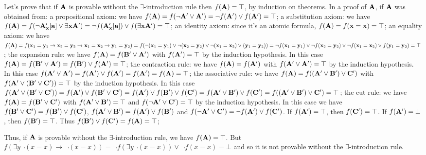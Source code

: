 Let's prove that if ${\bf A}$ is provable without the $\exists$-introduction rule then $f({\bf A}) = \top$, by induction on theorems.
In a proof of ${\bf A}$, if ${\bf A}$ was obtained from:
\itemitem{$\bullet$} a propositional axiom: we have $f({\bf A}) = f(\neg {\bf A}' \lor {\bf A}') = \neg f({\bf A}') \lor f({\bf A}') = \top$;
\itemitem{$\bullet$} a substitution axiom: we have 
$f({\bf A}) = f(\neg {\bf A}'_{\bf x}[{\bf a}] \lor \exists {\bf x}{\bf A}') = \neg f({\bf A}'_{\bf x}[{\bf a}]) \lor f(\exists {\bf x}{\bf A}') = \top$;
\itemitem{$\bullet$} an identity axiom: since it's an atomic formula, $f({\bf A}) = f({\bf x} = {\bf x}) = \top$;
\itemitem{$\bullet$} an equality axiom: we have $f({\bf A}) = 
f({\bf x}_1 = {\bf y}_1 \to {\bf x}_2 = {\bf y}_2 \to {\bf x}_1 = {\bf x}_2 \to {\bf y}_1 = {\bf y}_2) =
f(\neg ({\bf x}_1 = {\bf y}_1) \lor \neg ({\bf x}_2 = {\bf y}_2) \lor \neg ({\bf x}_1 = {\bf x}_2) \lor ({\bf y}_1 = {\bf y}_2)) =
\neg f({\bf x}_1 = {\bf y}_1) \lor \neg f({\bf x}_2 = {\bf y}_2) \lor \neg f({\bf x}_1 = {\bf x}_2) \lor f({\bf y}_1 = {\bf y}_2) = \top$;
\itemitem{$\bullet$} the expansion rule: we have $f({\bf A}) = f({\bf B}' \lor {\bf A}')$ with $f({\bf A}') = \top$ by the induction hypothesis.
In this case $f({\bf A}) = f({\bf B}' \lor {\bf A}') = f({\bf B}') \lor f({\bf A}') = \top$;
\itemitem{$\bullet$} the contraction rule: we have $f({\bf A}) = f({\bf A}')$ with $f({\bf A}' \lor {\bf A}') = \top$ by the induction hypothesis. 
In this case $f({\bf A}' \lor {\bf A}') = f({\bf A}') \lor f({\bf A}') = f({\bf A}') = f({\bf A}) = \top$;
\itemitem{$\bullet$} the associative rule: we have $f({\bf A}) = f(({\bf A}' \lor {\bf B}') \lor {\bf C}')$ with $f({\bf A}' \lor ({\bf B}' \lor {\bf C}')) = \top$ by the induction hypothesis.
In this case $f({\bf A}' \lor ({\bf B}' \lor {\bf C}')) = f({\bf A}') \lor f({\bf B}' \lor {\bf C}') = f({\bf A}') \lor f({\bf B}') \lor f({\bf C}') =
f({\bf A}' \lor {\bf B}') \lor f({\bf C}') = f(({\bf A}' \lor {\bf B}') \lor {\bf C}') = \top$;
\itemitem{$\bullet$} the cut rule: we have $f({\bf A}) = f({\bf B}' \lor {\bf C}')$ with $f({\bf A}' \lor {\bf B}') = \top$ and $f(\neg {\bf A}' \lor {\bf C}') = \top$ by the induction hypothesis.
In this case we have $f({\bf B}' \lor {\bf C}') = f({\bf B}') \lor f({\bf C}')$, $f({\bf A}' \lor {\bf B}') = f({\bf A}') \lor f({\bf B}')$ and
$f(\neg {\bf A}' \lor {\bf C}') = \neg f({\bf A}') \lor f({\bf C}')$. If $f({\bf A}') = \top$, then $f({\bf C}') = \top$. 
If $f({\bf A}') = \bot$, then $f({\bf B}') = \top$. Thus $f({\bf B}') \lor f({\bf C}') = f({\bf A}) = \top$;

Thus, if ${\bf A}$ is provable without the $\exists$-introduction rule, we have $f({\bf A}) = \top$. 
But $f(\exists y \neg (x=x) \to \neg (x=x)) = \neg f(\exists y \neg (x=x)) \lor \neg f(x=x) = \bot$ and so it is 
not provable without the $\exists$-introduction rule.
\smallskip

\vfill
\break
